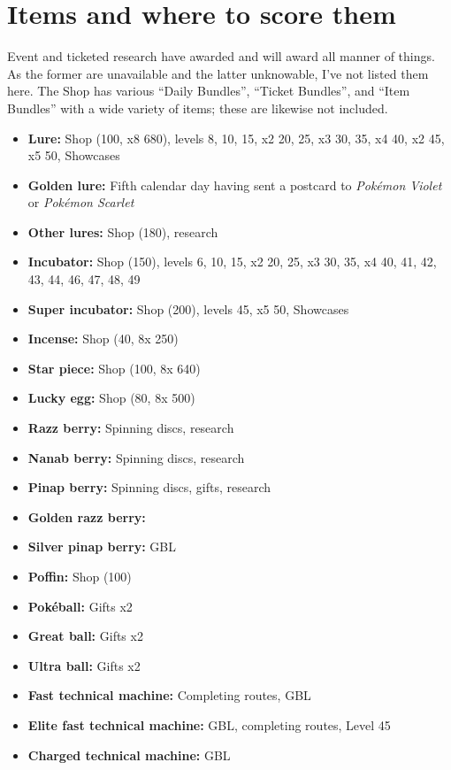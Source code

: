 \section{Items and where to score them\label{sec:items}}
Event and ticketed research have awarded and will award all manner of things.
As the former are unavailable and the latter unknowable, I've not listed them here.
The Shop has various ``Daily Bundles'', ``Ticket Bundles'', and ``Item Bundles'' with
 a wide variety of items; these are likewise not included.
\begin{itemize}
\item \textbf{Lure:} Shop (100\coin, x8 680\coin), levels 8, 10, 15, x2 20, 25, x3 30, 35, x4 40, x2 45, x5 50, Showcases
\item \textbf{Golden lure:} Fifth calendar day having sent a postcard to \textit{Pokémon Violet} or \textit{Pokémon Scarlet}
\item \textbf{Other lures:} Shop (180\coin), research
\item \textbf{Incubator:} Shop (150\coin), levels 6, 10, 15, x2 20, 25, x3 30, 35, x4 40, 41, 42, 43, 44, 46, 47, 48, 49
\item \textbf{Super incubator:} Shop (200\coin), levels 45, x5 50, Showcases
\item \textbf{Incense:} Shop (40\coin, 8x 250\coin)
\item \textbf{Star piece:} Shop (100\coin, 8x 640\coin)
\item \textbf{Lucky egg:} Shop (80\coin, 8x 500\coin)
\item \textbf{Razz berry:} Spinning discs, research
\item \textbf{Nanab berry:} Spinning discs, research
\item \textbf{Pinap berry:} Spinning discs, gifts, research
\item \textbf{Golden razz berry:}
\item \textbf{Silver pinap berry:} GBL
\item \textbf{Poffin:} Shop (100\coin)
\item \textbf{Pokéball:} Gifts x2
\item \textbf{Great ball:} Gifts x2
\item \textbf{Ultra ball:} Gifts x2
\item \textbf{Fast technical machine:} Completing routes, GBL
\item \textbf{Elite fast technical machine:} GBL, completing routes, Level 45
\item \textbf{Charged technical machine:} GBL

\end{itemize}
